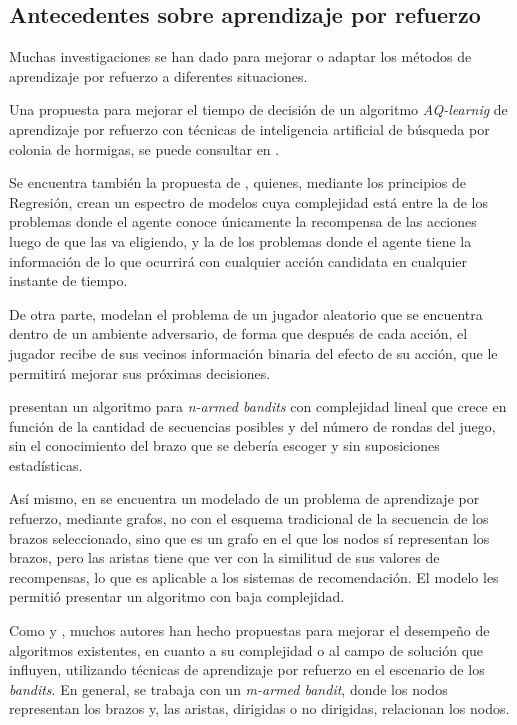 \subsection{Antecedentes sobre aprendizaje por refuerzo}
Muchas investigaciones se han dado para mejorar o adaptar los métodos de aprendizaje por refuerzo a diferentes situaciones.

Una propuesta para mejorar el tiempo de decisión de un algoritmo \textit{AQ-learnig} de aprendizaje por refuerzo con técnicas de inteligencia artificial de búsqueda por colonia de hormigas, se puede consultar en \citep{lee2005reinforcement}.

Se encuentra también la propuesta de \citet{alon2017nonstochastic}, quienes, mediante los principios de Regresión, crean un espectro de modelos cuya complejidad está entre la de los problemas donde el agente conoce únicamente la recompensa de las acciones luego de que las va eligiendo, y la de los problemas donde el agente tiene la información de lo que ocurrirá con cualquier acción candidata en cualquier instante de tiempo.

De otra parte, \citet{alon2015online} modelan el problema de un jugador aleatorio que se encuentra dentro de un ambiente adversario, de forma que después de cada acción, el jugador recibe de sus vecinos información binaria del efecto de su acción, que le permitirá mejorar sus próximas decisiones.

\citet{gokcesu2018online} presentan un algoritmo para \textit{n-armed bandits} con complejidad lineal que crece en función de la cantidad de secuencias posibles y del número de rondas del juego, sin el conocimiento del brazo que se debería escoger y sin suposiciones estadísticas.

Así mismo, en \citep{8170860} se encuentra un modelado de un problema de aprendizaje por refuerzo, mediante grafos, no con el esquema tradicional de la secuencia de los brazos seleccionado, sino que es un grafo en el que los nodos sí representan los brazos, pero las aristas tiene que ver con la similitud de sus valores de recompensas, lo que es aplicable a los sistemas de recomendación. El modelo les permitió presentar un algoritmo con baja complejidad. 

Como \citet{alon2017nonstochastic} y \citet{xu2017online}, muchos autores han hecho propuestas para mejorar el desempeño de algoritmos existentes, en cuanto a su complejidad o al campo de solución que influyen, utilizando técnicas de aprendizaje por refuerzo en el escenario de los \textit{bandits}. En general, se trabaja con un \textit{m-armed bandit}, donde los nodos representan los brazos y, las aristas, dirigidas o no dirigidas, relacionan los nodos.

